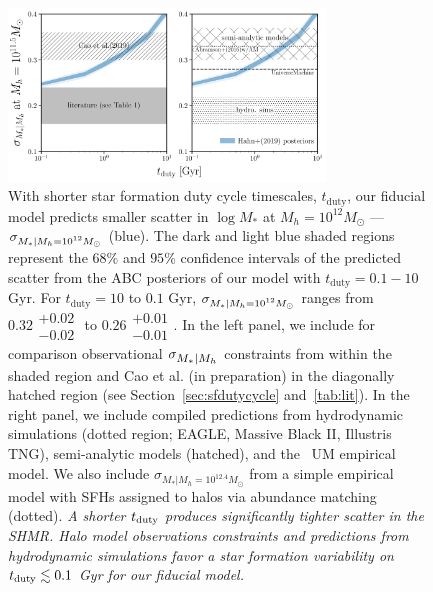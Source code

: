 \documentclass[12pt, letterpaper, preprint, tighten]{aastex62}
\newcommand{\edt}[1]{{\color{dred}{\bf} #1}}
\newcommand{\tduty}{t_{\rm duty}}
\newcommand{\siglogm}{\sigma_{\scaleto{M_*|M_h}{8pt}}}
\newcommand{\sigtwe}{\sigma_{\scaleto{M_*|M_h=10^{12}M_\odot}{8pt}}}
\begin{document}
\begin{figure}
\begin{center}
\includegraphics[width=0.75\textwidth]{figs/SHMRscatter_tduty_v2.pdf}
    \caption{With shorter star formation duty cycle timescales, $t_\mathrm{duty}$,
    our fiducial model predicts smaller scatter in $\log M_*$ at $M_h = 10^{12} M_\odot$ --- $\sigtwe$ (blue). 
    The dark and light blue shaded regions represent the $68\%$ and $95\%$ confidence
    intervals of the predicted scatter from the ABC posteriors of our
    model with $t_\mathrm{duty} = 0.1 - 10$ Gyr. For $t_\mathrm{duty} = 10$
    to $0.1$ Gyr, $\sigtwe$ ranges from $0.32\substack{+0.02\\ -0.02}$ to
    $0.26\substack{+0.01\\-0.01}$. In the left panel, we include for comparison
    observational $\siglogm$ constraints from \cite{leauthaud2012, zu2015, tinker2017, lange2018a}
    within the shaded region and Cao et al. (in preparation) in the diagonally 
    hatched region (see Section~\ref{sec:sfdutycycle} and~\ref{tab:lit}).
    In the right panel, we include compiled predictions from hydrodynamic simulations
    (dotted region; EAGLE, Massive Black II, Illustris TNG), semi-analytic models (hatched), and
    the~\cite{behroozi2019} {\sc UM} empirical model. We also include 
    $\sigma_{M_*|M_h = 10^{12.4} M_\odot}$ from a simple empirical model with \cite{abramson2016} 
    SFHs assigned to halos via abundance matching (dotted).
    \emph{A shorter $\tduty$ produces significantly tighter scatter in the SHMR.
    Halo model observations constraints and predictions from hydrodynamic simulations
    favor a star formation variability on $\tduty \lesssim 0.1$ Gyr for our fiducial
    model.}
    }
\label{fig:sigMstar_duty}
\end{center}
\end{figure}
\end{document}
